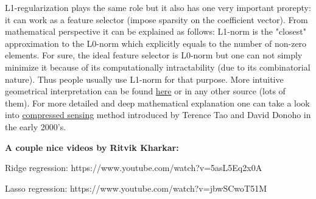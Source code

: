 \documentclass[11pt]{article}
\begin{document}
L1-regularization plays the same role but it also has one very important
prorepty: it can work as a feature selector (impose sparsity on the
coefficient vector). From mathematical perspective it can be explained
as follows: L1-norm is the "closest" approximation to the L0-norm which
explicitly equals to the number of non-zero elements. For sure, the
ideal feature selector is L0-norm but one can not simply minimize it
because of its computationally intractability (due to its combinatorial
nature). Thus people usually use L1-norm for that purpose. More
intuitive geometrical interpretation can be found
\href{https://www.quora.com/Why-is-L1-regularization-supposed-to-lead-to-sparsity-than-L2}{here}
or in any other source (lots of them). For more detailed and deep
mathematical explanation one can take a look into
\href{https://en.wikipedia.org/wiki/Compressed_sensing}{compressed
sensing} method introduced by Terence Tao and David Donoho in the early
2000's.

    \textbf{A couple nice videos by Ritvik Kharkar:}

Ridge regression: https://www.youtube.com/watch?v=5asL5Eq2x0A

Lasso regression: https://www.youtube.com/watch?v=jbwSCwoT51M


    
    
    
    
\end{document}
